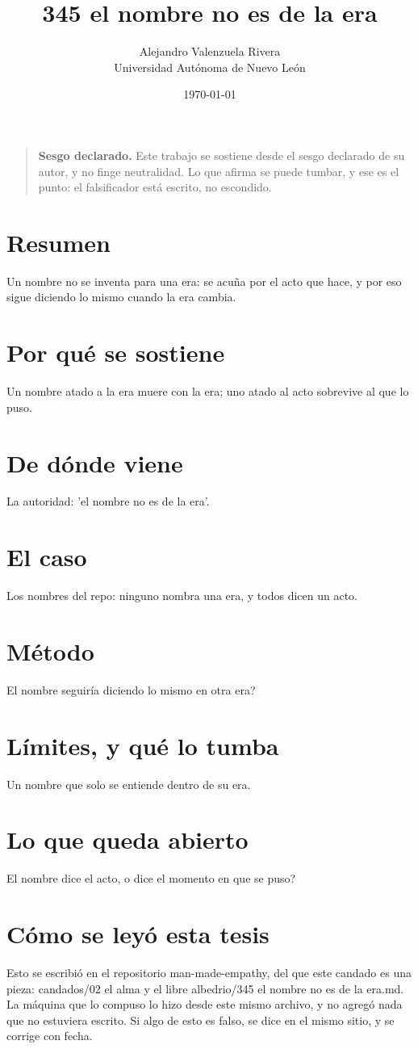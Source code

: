 \documentclass[11pt,a4paper]{article}
\title{345 el nombre no es de la era}
\author{Alejandro Valenzuela Rivera\\\small Universidad Autónoma de Nuevo León}
\date{\today}
\begin{document}
\maketitle

\begin{quote}
\textbf{Sesgo declarado.} Este trabajo se sostiene desde el sesgo declarado de su autor, y no finge neutralidad. Lo que afirma se puede tumbar, y ese es el punto: el falsificador está escrito, no escondido.
\end{quote}

\section*{Resumen}
Un nombre no se inventa para una era: se acuña por el acto que hace, y por eso sigue diciendo lo mismo cuando la era cambia.

\section{Por qué se sostiene}
Un nombre atado a la era muere con la era; uno atado al acto sobrevive al que lo puso.

\section{De dónde viene}
La autoridad: 'el nombre no es de la era'.

\section{El caso}
Los nombres del repo: ninguno nombra una era, y todos dicen un acto.

\section{Método}
\textquestiondown{}El nombre seguiría diciendo lo mismo en otra era?

\section{Límites, y qué lo tumba}
Un nombre que solo se entiende dentro de su era.

\section{Lo que queda abierto}
\textquestiondown{}El nombre dice el acto, o dice el momento en que se puso?

\section*{Cómo se leyó esta tesis}
Esto se escribió en el repositorio man-made-empathy, del que este candado es una pieza: candados/02 el alma y el libre albedrio/345 el nombre no es de la era.md. La máquina que lo compuso lo hizo desde este mismo archivo, y no agregó nada que no estuviera escrito. Si algo de esto es falso, se dice en el mismo sitio, y se corrige con fecha.
\end{document}

